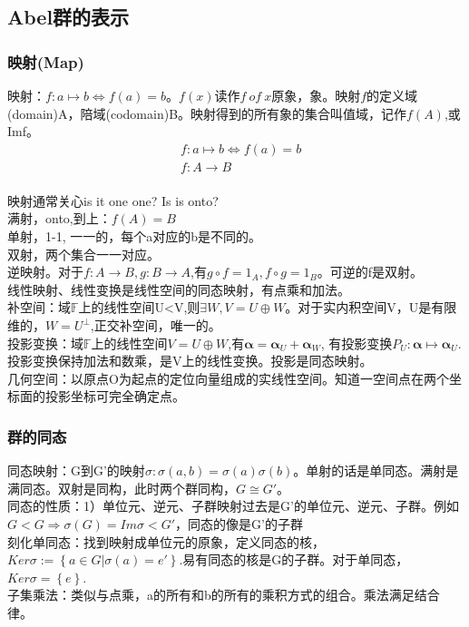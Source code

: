 \subsection{Abel群的表示}
\subsubsection{映射(Map)}
映射：$f:a \mapsto b \Leftrightarrow f(a)=b$。$f(x)读作f \ of \ x$原象，象。映射$f$的定义域(domain)A，陪域(codomain)B。映射得到的所有象的集合叫值域，记作$f(A)$,或Imf。
\begin{equation}
  \begin{split}
  &f:a \mapsto b \Leftrightarrow f(a)=b\\
  &f: A \to B\\
  \end{split}
\end{equation}

映射通常关心is it one one? Is is onto? \\
满射，onto,到上：$f(A)=B$\\
单射，1-1, 一一的，每个a对应的b是不同的。\\
双射，两个集合一一对应。\\
逆映射。对于$f:A \to B, g: B \to A$,有$g \circ f =1_A, f \circ g =1_B$。可逆的f是双射。\\

线性映射、线性变换是线性空间的同态映射，有点乘和加法。\\
补空间：域$\mathbb F$上的线性空间U<V,则$\exists W, V=U \oplus W$。对于实内积空间V，U是有限维的，$W=U^{\perp}$,正交补空间，唯一的。\\
投影变换：域$\mathbb F$上的线性空间$V=U \oplus W$,有$\mathbf \alpha =\mathbf \alpha _U+\mathbf \alpha _W$, 有投影变换$P_U:\mathbf \alpha \mapsto \mathbf \alpha _U$.投影变换保持加法和数乘，是V上的线性变换。投影是同态映射。\\
几何空间：以原点O为起点的定位向量组成的实线性空间。知道一空间点在两个坐标面的投影坐标可完全确定点。

\subsubsection{群的同态}
同态映射：G到G'的映射$\sigma: \sigma(a,b)=\sigma(a) \sigma(b)$。单射的话是单同态。满射是满同态。双射是同构，此时两个群同构，$G \cong G'$。\\
同态的性质：1）单位元、逆元、子群映射过去是G’的单位元、逆元、子群。例如$G<G \Rightarrow \sigma(G)=Im\sigma <G'$，同态的像是G'的子群\\
刻化单同态：找到映射成单位元的原象，定义同态的核，$Ker\sigma:=\left\{ a \in G | \sigma(a)=e' \right\}$.易有同态的核是G的子群。对于单同态，$Ker\sigma=\left\{ e \right\}$.\\
子集乘法：类似与点乘，a的所有和b的所有的乘积方式的组合。乘法满足结合律。\\

